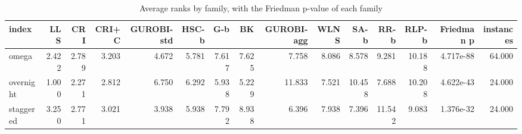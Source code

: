 \begin{table}[htbp]
\centering
\small
\caption{Average ranks by family, with the Friedman p-value of each family}
\label{tab:E4a_equal_budgets_b1_ranks_by_family}
\begin{tabular}{lrrrrrrrrrrrrrr}
\toprule
index & LLS & CRI & CRI+C & GUROBI-std & HSC-b & G-b & BK & GUROBI-agg & WLNS & SA-b & RR-b & RLP-b & Friedman p & instances \\
\midrule
omega & 2.422 & 2.789 & 3.203 & 4.672 & 5.781 & 7.617 & 7.625 & 7.758 & 8.086 & 8.578 & 9.281 & 10.188 & 4.717e-88 & 64.000 \\
overnight & 1.000 & 2.271 & 2.812 & 6.750 & 6.292 & 5.938 & 5.229 & 11.833 & 7.521 & 10.458 & 7.688 & 10.208 & 4.622e-43 & 24.000 \\
staggered & 3.250 & 2.771 & 3.021 & 3.938 & 5.938 & 7.792 & 8.938 & 6.396 & 7.938 & 7.396 & 11.542 & 9.083 & 1.376e-32 & 24.000 \\
\bottomrule
\end{tabular}
\end{table}
